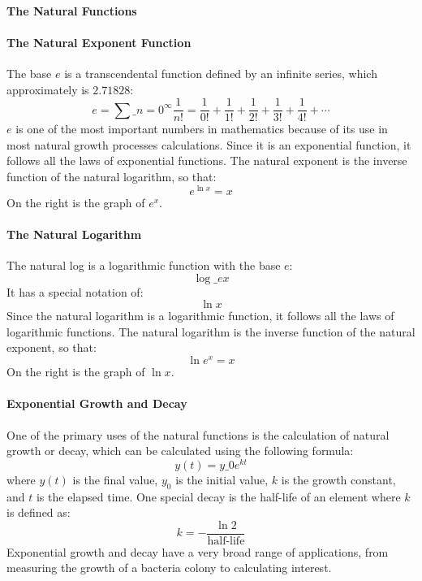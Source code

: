 \paragraph{The Natural Functions}



\paragraph{The Natural Exponent Function}



The base $e$ is a transcendental function defined by an infinite series, which approximately is $2.71828$:
$$
e = \sum\_{n=0}^{\infty} \frac{1}{n!} = \frac{1}{0!} + \frac{1}{1!} + \frac{1}{2!} + \frac{1}{3!} + \frac{1}{4!} + \cdots
$$
$e$ is one of the most important numbers in mathematics because of its use in most natural growth processes calculations. Since it is an exponential function, it follows all the laws of exponential functions. The natural exponent is the inverse function of the natural logarithm, so that:
$$
e^{\ln x} = x
$$
On the right is the graph of $e^x$.



\paragraph{The Natural Logarithm}



The natural log is a logarithmic function with the base $e$:
$$
\log\_e x
$$
It has a special notation of:
$$
\ln x
$$
Since the natural logarithm is a logarithmic function, it follows all the laws of logarithmic functions. The natural logarithm is the inverse function of the natural exponent, so that:
$$
\ln e^x = x
$$
On the right is the graph of $\ln x$.



\paragraph{Exponential Growth and Decay}



One of the primary uses of the natural functions is the calculation of natural growth or decay, which can be calculated using the following formula:
$$
y(t) = y\_0 e^{kt}
$$
where $y(t)$ is the final value, $y_0$ is the initial value, $k$ is the growth constant, and $t$ is the elapsed time. One special decay is the half-life of an element where $k$ is defined as:
$$
k = -\frac{\ln 2}{\text{half-life}}
$$
Exponential growth and decay have a very broad range of applications, from measuring the growth of a bacteria colony to calculating interest.



